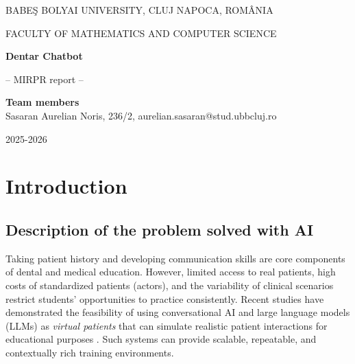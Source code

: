 \documentclass[runningheads,a4paper,11pt]{report}
\begin{document}
\begin{titlepage}
\sloppy

\begin{center}
BABE\c S BOLYAI UNIVERSITY, CLUJ NAPOCA, ROM\^ ANIA

FACULTY OF MATHEMATICS AND COMPUTER SCIENCE

\vspace{6cm}

\Huge \textbf{Dentar Chatbot}

\vspace{1cm}

\normalsize -- MIRPR report --

\end{center}


\vspace{5cm}

\begin{flushright}
\Large{\textbf{Team members}}\\
Sasaran Aurelian Noris, 236/2, aurelian.sasaran@stud.ubbcluj.ro
\end{flushright}

\vspace{4cm}

\begin{center}
2025-2026
\end{center}

\end{titlepage}


\chapter{Introduction}
\section{Description of the problem solved with AI}


Taking patient history and developing communication skills are core components of dental and medical education. However, limited access to real patients, high costs of standardized patients (actors), and the variability of clinical scenarios restrict students' opportunities to practice consistently. Recent studies have demonstrated the feasibility of using conversational AI and large language models (LLMs) as \emph{virtual patients} that can simulate realistic patient interactions for educational purposes \cite{suarez2022, or2024, jones2025, cepdnaclk2022}. Such systems can provide scalable, repeatable, and contextually rich training environments.
\end{document}
